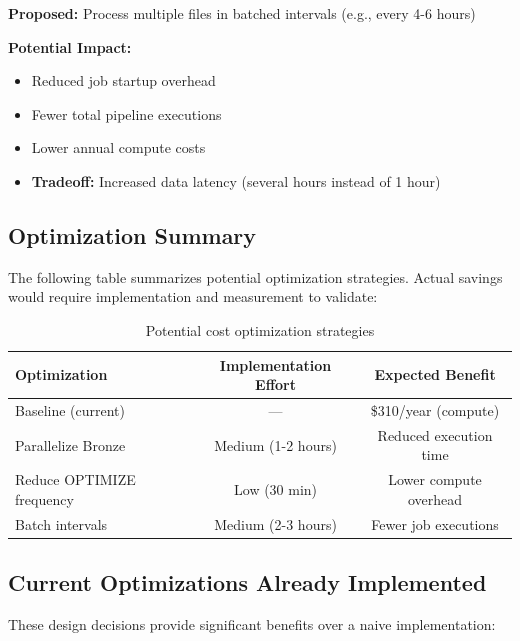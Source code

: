 \documentclass[11pt,a4paper]{article}
\begin{document}
\textbf{Proposed:} Process multiple files in batched intervals (e.g., every 4-6 hours)

\textbf{Potential Impact:}
\begin{itemize}
    \item Reduced job startup overhead
    \item Fewer total pipeline executions
    \item Lower annual compute costs
    \item \textbf{Tradeoff:} Increased data latency (several hours instead of 1 hour)
\end{itemize}

\subsection{Optimization Summary}

The following table summarizes potential optimization strategies. Actual savings would require implementation and measurement to validate:

\begin{table}[h]
\centering
\begin{tabular}{@{}lcc@{}}
\toprule
\textbf{Optimization} & \textbf{Implementation Effort} & \textbf{Expected Benefit} \\
\midrule
Baseline (current) & --- & \$310/year (compute) \\
Parallelize Bronze & Medium (1-2 hours) & Reduced execution time \\
Reduce OPTIMIZE frequency & Low (30 min) & Lower compute overhead \\
Batch intervals & Medium (2-3 hours) & Fewer job executions \\
\bottomrule
\end{tabular}
\caption{Potential cost optimization strategies}
\end{table}

\subsection{Current Optimizations Already Implemented}

These design decisions provide significant benefits over a naive implementation:
\end{document}
